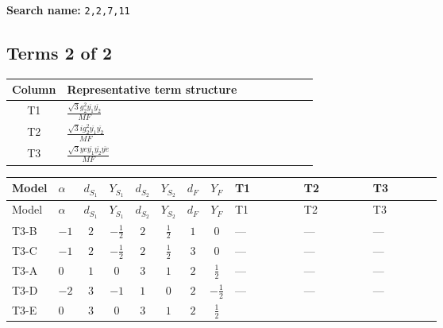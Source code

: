 \documentclass[8pt]{article}
\begin{document}
\begin{landscape}
\begin{longtable}{@{}llcccccc >{\raggedright\arraybackslash}p{0.21\linewidth} >{\raggedright\arraybackslash}p{0.21\linewidth} >{\raggedright\arraybackslash}p{0.21\linewidth}@{}}
\midrule
\bottomrule
\end{longtable}
\clearpage
\noindent\textbf{Search name: }\texttt{2,2,7,11}\par\smallskip
\subsection*{Terms 2 of 2}
\begin{center}
\begin{tabular}{@{}c >{\raggedright\arraybackslash}p{0.82\linewidth}@{}}
\toprule
Column & Representative term structure \\
\midrule
T1 & \(\displaystyle \frac{\sqrt{3} g_{2}^{2} \overline{y_{1}} \overline{y_{2}}}{MF}\) \\
\midrule
T2 & \(\displaystyle \frac{\sqrt{3} i g_{2}^{2} \overline{y_{1}} \overline{y_{2}}}{MF}\) \\
\midrule
T3 & \(\displaystyle \frac{\sqrt{3} ye \overline{y_{1}} \overline{y_{2}} \overline{ye}}{MF}\) \\
\midrule
\bottomrule
\end{tabular}
\end{center}
\smallskip
\tiny
\begin{longtable}{@{}llcccccc >{\raggedright\arraybackslash}p{0.21\linewidth} >{\raggedright\arraybackslash}p{0.21\linewidth} >{\raggedright\arraybackslash}p{0.21\linewidth}@{}}
\toprule
Model & $\alpha$ & $d_{S_1}$ & $Y_{S_1}$ & $d_{S_2}$ & $Y_{S_2}$ & $d_F$ & $Y_F$ & T1 & T2 & T3 \\
\midrule
\endfirsthead
\toprule
Model & $\alpha$ & $d_{S_1}$ & $Y_{S_1}$ & $d_{S_2}$ & $Y_{S_2}$ & $d_F$ & $Y_F$ & T1 & T2 & T3 \\
\midrule
\endhead
T3-B & $-1$ & $2$ & $-\frac{1}{2}$ & $2$ & $\frac{1}{2}$ & $1$ & $0$ & --- & --- & --- \\
\midrule
T3-C & $-1$ & $2$ & $-\frac{1}{2}$ & $2$ & $\frac{1}{2}$ & $3$ & $0$ & --- & --- & --- \\
\midrule
T3-A & $0$ & $1$ & $0$ & $3$ & $1$ & $2$ & $\frac{1}{2}$ & --- & --- & --- \\
\midrule
T3-D & $-2$ & $3$ & $-1$ & $1$ & $0$ & $2$ & $-\frac{1}{2}$ & --- & --- & --- \\
\midrule
T3-E & $0$ & $3$ & $0$ & $3$ & $1$ & $2$ & $\frac{1}{2}$ & \scriptsize\adjustbox{max width=\linewidth}{$\begin{gathered} \frac{11 \sqrt{3} g_{2}^{2} \overline{y_{1}} \overline{y_{2}}}{8 MF}\end{gathered}$} & \scriptsize\adjustbox{max width=\linewidth}{$\begin{gathered} - \frac{\sqrt{3} i g_{2}^{2} \overline{y_{1}} \overline{y_{2}}}{6 MF}\end{gathered}$} & \scriptsize\adjustbox{max width=\linewidth}{$\begin{gathered} - \frac{\sqrt{3} ye \overline{y_{1}} \overline{y_{2}} \overline{ye}}{12 MF}\end{gathered}$} \\
\midrule
\bottomrule
\end{longtable}
\clearpage

\end{landscape}
\end{document}
